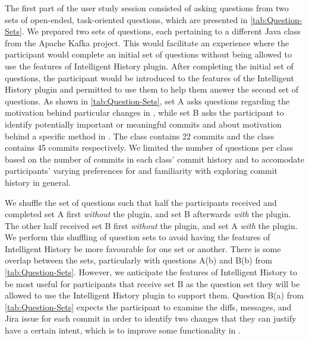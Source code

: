 The first part of the user study session consisted of asking questions from two sets of open-ended, task-oriented questions, which are presented in \autoref{tab:Question-Sets}.
We prepared two sets of questions, each pertaining to a different Java class from the Apache Kafka project.
This would facilitate an experience where the participant would complete an initial set of questions without being allowed to use the features of Intelligent History plugin.
After completing the initial set of questions, the participant would be introduced to the features of the Intelligent History plugin and permitted to use them to help them answer the second set of questions.
As shown in \autoref{tab:Question-Sets}, set A asks questions regarding the motivation behind particular changes in , while set B asks the participant to identify potentially important or meaningful commits and about motivation behind a specific method in .
The  class contains 22 commits and the  class contains 45 commits respectively.
We limited the number of questions per class based on the number of commits in each class' commit history and to accomodate participants' varying preferences for and familiarity with exploring commit history in general.


We shuffle the set of questions such that half the participants received and completed set A first \emph{without} the plugin, and set B afterwards \emph{with} the plugin.
The other half received set B first \emph{without} the plugin, and set A \emph{with} the plugin.
We perform this shuffling of question sets to avoid having the features of Intelligent History be more favourable for one set or another.
There is some overlap between the sets, particularly with questions A(b) and B(b) from \autoref{tab:Question-Sets}.
However, we anticipate the features of Intelligent History to be most useful for participants that receive set B as the question set they will be allowed to use the Intelligent History plugin to support them.
Question B(a) from \autoref{tab:Question-Sets} expects the participant to examine the diffs, messages, and Jira issue for each commit in order to identify two changes that they can justify have a certain intent, which is to improve some functionality in . 

